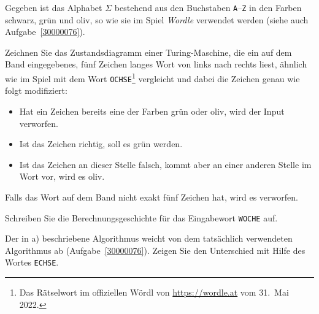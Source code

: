 \bgroup
{}
\def\schwarz#1{{\texttt{#1}}}
\def\gruen#1{{\color{wordlegreen}\texttt{#1}}}
\def\oliv#1{{\color{wordleolive}\texttt{#1}}}

Gegeben ist das Alphabet $\Sigma$ bestehend aus den Buchstaben
\texttt{A}--\texttt{Z}
in den Farben schwarz, grün und oliv, so wie sie im Spiel {\em Wordle}
verwendet werden (siehe auch Aufgabe~\ref{30000076}).
\begin{teilaufgaben}
\item
Zeichnen Sie das Zustandsdiagramm einer Turing-Maschine, die 
ein auf dem Band eingegebenes, fünf Zeichen langes Wort von links
nach rechts liest,
ähnlich wie im Spiel mit dem Wort \texttt{OCHSE}\footnote{Das Rätselwort im
offiziellen Wördl von \url{https://wordle.at} vom 31.~Mai 2022.}
vergleicht und dabei die Zeichen genau wie folgt modifiziert:
\begin{itemize}
\item
Hat ein Zeichen bereits eine der Farben grün oder oliv, wird der Input
verworfen.
\item
Ist das Zeichen richtig, soll es grün werden.
\item
Ist das Zeichen an dieser Stelle falsch, kommt aber an einer anderen Stelle im 
Wort vor, wird es oliv.
\end{itemize}
Falls das Wort auf dem Band nicht exakt fünf Zeichen hat, wird es verworfen.
\item
Schreiben Sie die Berechnungsgeschichte für das Eingabewort \texttt{WOCHE}
auf.
\item
Der in a) beschriebene Algorithmus weicht von dem tatsächlich verwendeten
Algorithmus ab (Aufgabe~\ref{30000076}).
Zeigen Sie den Unterschied mit Hilfe des Wortes \texttt{ECHSE}.
\end{teilaufgaben}


